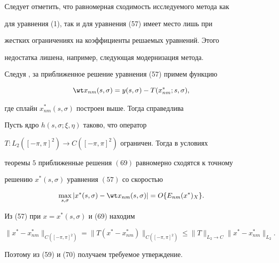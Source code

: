  


Следует отметить, что равномерная сходимость исследуемого метода как 


для уравнения (1), так и для уравнения (57) имеет место лишь при 


жестких ограничениях на коэффициенты решаемых уравнений. Этого 


недостатка лишена, например, следующая модернизация метода. 


 


Следуя \cite{14}, за приближенное решение уравнения (57) примем функцию 


\begin{equation} 


\wt x_{nm}(s,\sigma)=y(s,\sigma)- 


T(x^*_{nm};s,\sigma), 


\end{equation} 


где сплайн $x^*_{nm}(s,\sigma)$ построен выше. Тогда справедлива 


 


\begin{thm} 


Пусть ядро $h(s,\sigma;\xi,\eta)$ таково, что оператор 


$T:L_2([-\pi,\pi]^2)\to C([-\pi,\pi]^2)$ ограничен. Тогда в условиях 


теоремы $5$ приближенные решения $(69)$ равномерно сходятся к точному 


решению $x^*(s,\sigma)$ уравнения $(57)$ со скоростью 


$$ 


\max_{s,\sigma}|x^*(s,\sigma)-\wt x_{nm}(s,\sigma)|= 


O\{E_{nm}(x^*)_X\}. 


$$ 


\end{thm} 


 


\begin{pf} 


Из (57) при $x=x^*(s,\sigma)$ и (69) находим 


\begin{equation} 


\|x^*-x^*_{nm}\|_{C([-\pi,\pi]^2)}= 


\|T(x^*-x^*_{nm})\|_{C([-\pi,\pi]^2)}\le 


\|T\|_{L_2\to C}\|x^*-x^*_{nm}\|_{L_2}. 


\end{equation} 


Поэтому из (59) и (70) получаем требуемое утверждение. 


\end{pf} 


